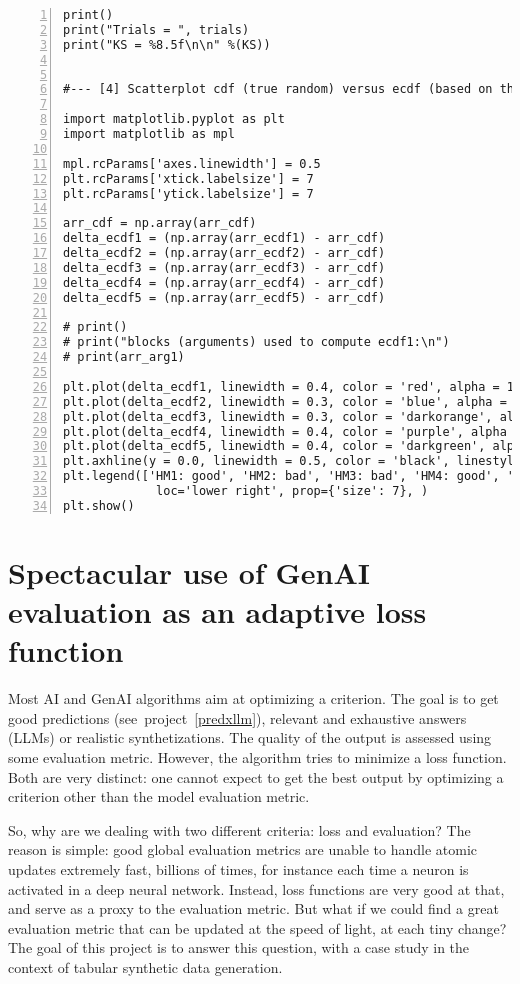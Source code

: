 \documentclass[oneside,10pt]{book}
\begin{document}
\begin{lstlisting}[numbers=left]
print()
print("Trials = ", trials)
print("KS = %8.5f\n\n" %(KS))


#--- [4] Scatterplot cdf (true random) versus ecdf (based on the two PRNGs) 

import matplotlib.pyplot as plt
import matplotlib as mpl

mpl.rcParams['axes.linewidth'] = 0.5
plt.rcParams['xtick.labelsize'] = 7
plt.rcParams['ytick.labelsize'] = 7

arr_cdf = np.array(arr_cdf) 
delta_ecdf1 = (np.array(arr_ecdf1) - arr_cdf) 
delta_ecdf2 = (np.array(arr_ecdf2) - arr_cdf) 
delta_ecdf3 = (np.array(arr_ecdf3) - arr_cdf) 
delta_ecdf4 = (np.array(arr_ecdf4) - arr_cdf) 
delta_ecdf5 = (np.array(arr_ecdf5) - arr_cdf) 

# print()
# print("blocks (arguments) used to compute ecdf1:\n")
# print(arr_arg1)

plt.plot(delta_ecdf1, linewidth = 0.4, color = 'red', alpha = 1)
plt.plot(delta_ecdf2, linewidth = 0.3, color = 'blue', alpha = 0.5)
plt.plot(delta_ecdf3, linewidth = 0.3, color = 'darkorange', alpha = 1)
plt.plot(delta_ecdf4, linewidth = 0.4, color = 'purple', alpha = 1)
plt.plot(delta_ecdf5, linewidth = 0.4, color = 'darkgreen', alpha = 1)
plt.axhline(y = 0.0, linewidth = 0.5, color = 'black', linestyle = 'dashed')
plt.legend(['HM1: good', 'HM2: bad', 'HM3: bad', 'HM4: good', 'Numpy'], 
             loc='lower right', prop={'size': 7}, )
plt.show()
\end{lstlisting}


\section{Spectacular use of GenAI evaluation as an adaptive  loss function}

Most AI and GenAI algorithms aim at optimizing a criterion. The goal is to get good predictions (see~project~\ref{predxllm}), relevant 
 and exhaustive answers (LLMs) 
 or realistic synthetizations. The quality of the output is assessed using some 
\textcolor{index}{evaluation metric}. However, the algorithm tries to minimize a
 \textcolor{index}{loss function}. Both are very distinct: one cannot expect to get the best output by optimizing a criterion other than the model evaluation metric. 

So, why are we dealing with two different criteria: loss and evaluation? The reason is simple: good global evaluation metrics are
 unable to handle atomic updates extremely fast, billions of times, for instance each time a neuron is activated in a 
\textcolor{index}{deep neural network}. Instead, loss functions are very good at that, and serve as a proxy to the evaluation metric. But what if we could find a great
 evaluation metric that can be updated at the speed of light, at each tiny change? The goal of this project is to answer this question, with
 a case study in the context of tabular \textcolor{index}{synthetic data} generation.
\end{document}
